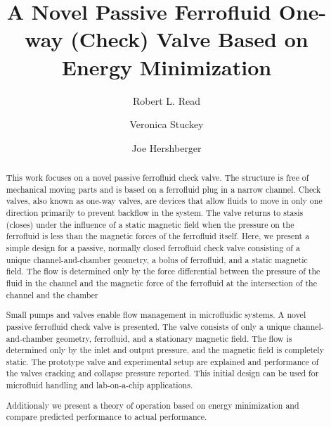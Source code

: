 \documentclass{asme2ej}
\title{A Novel Passive Ferrofluid One-way (Check) Valve Based on Energy Minimization}
\author{Robert L. Read
\affiliation{
  Founder, Public Invention\\
  Email: read.robert@pubinv.org
    }
}
\author{Veronica Stuckey
  \affiliation{
    Biomedical Engineer, University of Texas at Austin \\
    }
}
\author{Joe Hershberger
\affiliation{
  Investigator, Public Invention\\
    }
}
\begin{document}
\maketitle

\begin{abstract}

This work focuses on a novel passive ferrofluid check valve. The structure is free of mechanical moving parts and is based on a ferrofluid plug in a narrow channel.
Check valves, also known as one-way valves, are devices that allow fluids to move in only one direction primarily to prevent backflow in the system.
The valve returns to stasis (closes) under the influence of a static magnetic field when the pressure on the ferrofluid is less than the magnetic forces of the ferrofluid itself.
Here, we present a simple design for a passive, normally closed ferrofluid check valve consisting of a unique channel-and-chamber geometry, a bolus of ferrofluid, and a static magnetic field.
The flow is determined only by the force differential between the pressure of the fluid in the channel and the magnetic force of the ferrofluid at the intersection of the channel and the chamber

Small pumps and valves enable flow management in microfluidic systems.
A novel passive ferrofluid check valve is presented.
The valve consists of only a
unique channel-and-chamber geometry, ferrofluid, and a stationary
magnetic field.
The flow is determined only by the inlet and output pressure,
and the magnetic field is completely static.
The prototype valve and experimental setup are explained
and performance of the valves cracking and collapse pressure reported.
This initial design can be used for microfluid handling and lab-on-a-chip
applications.

Additionaly we present a theory of operation based on energy minimization
and compare predicted performance to actual performance.
\end{abstract}

\end{document}
